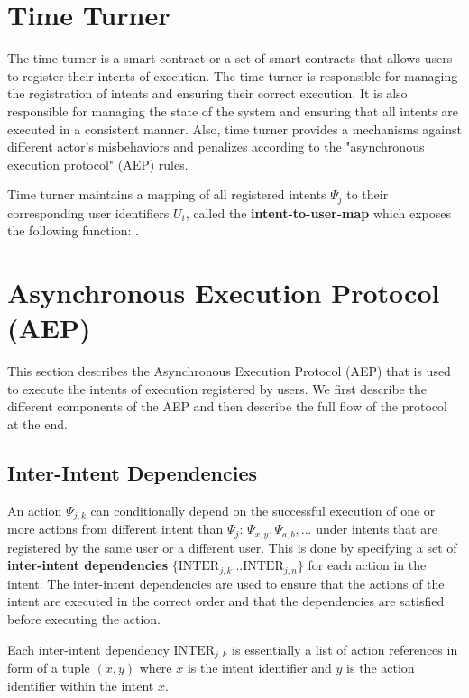 \section{Time Turner}
The time turner is a smart contract or a set of smart contracts that allows users to register their intents of execution. The time turner is responsible for managing the registration of intents and ensuring their correct execution. It is also responsible for managing the state of the system and ensuring that all intents are executed in a consistent manner. Also, time turner provides a mechanisms against different actor's misbehaviors and penalizes according to the "asynchronous execution protocol" (AEP) rules. 

Time turner maintains a mapping of all registered intents $\Psi_j$ to their corresponding user identifiers $U_i$, called the \textbf{intent-to-user-map} which exposes the following function: .



\section{Asynchronous Execution Protocol (AEP)}

This section describes the Asynchronous Execution Protocol (AEP) that is used to execute the intents of execution registered by users. We first describe the different components of the AEP and then describe the full flow of the protocol at the end.

\subsection{Inter-Intent Dependencies}
An action $\Psi_{j, k}$ can conditionally depend on the successful execution of one or more actions from different intent than $\Psi_{j}$: $\Psi_{x, y}, \Psi_{a, b}, ...$ under intents that are registered by the same user or a different user. This is done by specifying a set of \textbf{inter-intent dependencies} $\{\text{INTER}_{j, k} ... \text{INTER}_{j, n}\}$ for each action in the intent. The inter-intent dependencies are used to ensure that the actions of the intent are executed in the correct order and that the dependencies are satisfied before executing the action.

Each inter-intent dependency $\text{INTER}_{j, k}$ is essentially a list of action references in form of a tuple $(x, y)$ where $x$ is the intent identifier and $y$ is the action identifier within the intent $x$.

